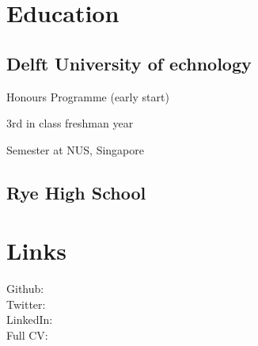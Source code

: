 \documentclass[]{deedy-resume-openfont}
\begin{document}

%
%

%
%
\begin{minipage}[t]{0.33\textwidth} 

\section{Education} 

\subsection{Delft University of \texorpdfstring{\newline} Technology}
\vspace{\topsep}
\begin{tightemize}
    \item Honours Programme (early start)
    \item 3rd in class freshman year
    \item Semester at NUS, Singapore
\end{tightemize}
\vspace{\topsep}

\subsection{Rye High School}
\sectionsep


\section{Links} 
Github: \href{https://github.com/leonoverweel}{} \\
Twitter: \href{https://twitter.com/layon_overwhale}{} \\
LinkedIn: \href{https://www.linkedin.com/in/leonoverweel}{} \\
Full CV: \href{https://leonoverweel.github.io/resume/}{} \\
\sectionsep


\end{minipage}
\end{document}
